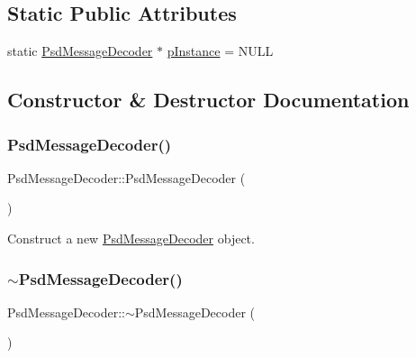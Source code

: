 \subsection*{Static Public Attributes}
\begin{DoxyCompactItemize}
\item 
static \hyperlink{class_psd_message_decoder}{Psd\+Message\+Decoder} $\ast$ \hyperlink{class_psd_message_decoder_ad1944184b781d22c108add0c2cbdb166}{p\+Instance} = N\+U\+LL
\end{DoxyCompactItemize}


\subsection{Constructor \& Destructor Documentation}
\mbox{\label{class_psd_message_decoder_ac767a18e119cad2cc3dbfbcac6368af2}} 
\subsubsection{\texorpdfstring{Psd\+Message\+Decoder()}{PsdMessageDecoder()}}
{\footnotesize\ttfamily Psd\+Message\+Decoder\+::\+Psd\+Message\+Decoder (\begin{DoxyParamCaption}{ }\end{DoxyParamCaption})}



Construct a new \hyperlink{class_psd_message_decoder}{Psd\+Message\+Decoder} object. 

\mbox{\label{class_psd_message_decoder_a097a557e58d4b9782660aba304cd2bba}} 
\subsubsection{\texorpdfstring{$\sim$\+Psd\+Message\+Decoder()}{~PsdMessageDecoder()}}
{\footnotesize\ttfamily Psd\+Message\+Decoder\+::$\sim$\+Psd\+Message\+Decoder (\begin{DoxyParamCaption}{ }\end{DoxyParamCaption})}



